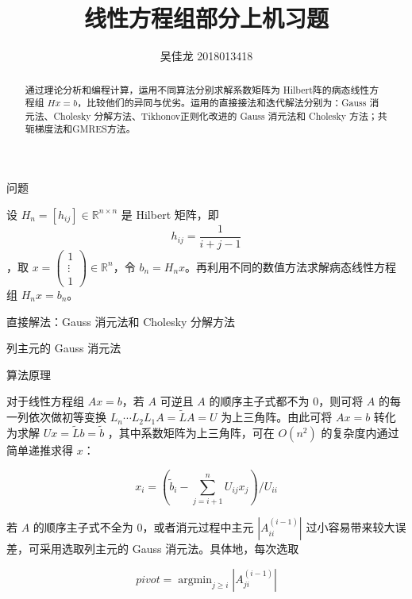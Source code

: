 \documentclass[a4paper]{article}
\providecommand{\keywords}[1]{\textbf{\textit{关键词}} #1}
\begin{document}
 
\title{线性方程组部分上机习题}
\author{吴佳龙 2018013418}
\date{}
\maketitle

\begin{abstract}
	通过理论分析和编程计算，运用不同算法分别求解系数矩阵为 Hilbert阵的病态线性方程组 $Hx=b$，比较他们的异同与优劣。运用的直接接法和迭代解法分别为：Gauss 消元法、Cholesky 分解方法、Tikhonov正则化改进的 Gauss 消元法和 Cholesky 方法；共轭梯度法和GMRES方法。
\end{abstract}


\begin{multicols}{2}

\begin{section}{问题}

设 $H_{n}=\left[h_{i j}\right] \in \mathbb{R}^{n \times n}$ 是 Hilbert 矩阵，即 $$h_{i j}=\frac{1}{i+j-1}$$，取 $x=\left(\begin{array}{c}{1} \\ {\vdots} \\ {1}\end{array}\right) \in \mathbb{R}^{n}$，令 $b_n = H_nx$。再利用不同的数值方法求解病态线性方程组 $H_nx=b_n$。
	
\end{section}

\begin{section}{直接解法：Gauss 消元法和 Cholesky 分解方法}

	\begin{subsection}{列主元的 Gauss 消元法}
	
		\begin{subsubsection}{算法原理}
		
			对于线性方程组 $Ax=b$，若 $A$ 可逆且 $A$ 的顺序主子式都不为 $0$，则可将 $A$ 的每一列依次做初等变换 $L_n \cdots L_2 L_1A = \tilde{L}A = U$ 为上三角阵。由此可将 $Ax=b$ 转化为求解 $Ux = \tilde{L}b = \tilde{b}$ ，其中系数矩阵为上三角阵，可在 $O(n^2)$ 的复杂度内通过简单递推求得 $x$：
			
			$$x_i = (\tilde{b}_i - \sum_{j=i+1}^n U_{ij} x_{j}) / U_{ii}$$
			
			若 $A$ 的顺序主子式不全为 $0$，或者消元过程中主元 $|A_{ii}^{(i-1)}|$ 过小容易带来较大误差，可采用选取列主元的 Gauss 消元法。具体地，每次选取 
			
			$$pivot = \mathop{\arg\min}_{j\ge i} |A_{ji}^{(i-1)}|$$ 
			

\end{subsubsection}
\end{subsection}
\end{section}
\end{multicols}
\end{document}

